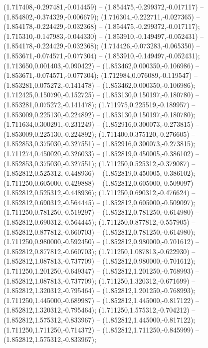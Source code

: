  (1.717408,-0.297481,-0.014459) -- (1.854475,-0.299372,-0.017117) -- (1.854802,-0.374329,-0.006679);
 (1.716304,-0.222711,-0.027365) -- (1.854178,-0.224429,-0.032368) -- (1.854475,-0.299372,-0.017117);
 (1.715310,-0.147983,-0.044330) -- (1.853910,-0.149497,-0.052431) -- (1.854178,-0.224429,-0.032368);
 (1.714426,-0.073283,-0.065350) -- (1.853671,-0.074571,-0.077304) -- (1.853910,-0.149497,-0.052431);
 (1.713650,0.001403,-0.090422) -- (1.853462,0.000350,-0.106986) -- (1.853671,-0.074571,-0.077304);
 (1.712984,0.076089,-0.119547) -- (1.853281,0.075272,-0.141478) -- (1.853462,0.000350,-0.106986);
 (1.712425,0.150790,-0.152725) -- (1.853130,0.150197,-0.180780) -- (1.853281,0.075272,-0.141478);
 (1.711975,0.225519,-0.189957) -- (1.853009,0.225130,-0.224892) -- (1.853130,0.150197,-0.180780);
 (1.711634,0.300291,-0.231249) -- (1.852916,0.300073,-0.273815) -- (1.853009,0.225130,-0.224892);
 (1.711400,0.375120,-0.276605) -- (1.852853,0.375030,-0.327551) -- (1.852916,0.300073,-0.273815);
 (1.711274,0.450020,-0.326033) -- (1.852819,0.450005,-0.386102) -- (1.852853,0.375030,-0.327551);
 (1.711250,0.525312,-0.379087) -- (1.852812,0.525312,-0.448936) -- (1.852819,0.450005,-0.386102);
 (1.711250,0.605000,-0.429888) -- (1.852812,0.605000,-0.509097) -- (1.852812,0.525312,-0.448936);
 (1.711250,0.690312,-0.476624) -- (1.852812,0.690312,-0.564445) -- (1.852812,0.605000,-0.509097);
 (1.711250,0.781250,-0.519297) -- (1.852812,0.781250,-0.614980) -- (1.852812,0.690312,-0.564445);
 (1.711250,0.877812,-0.557905) -- (1.852812,0.877812,-0.660703) -- (1.852812,0.781250,-0.614980);
 (1.711250,0.980000,-0.592450) -- (1.852812,0.980000,-0.701612) -- (1.852812,0.877812,-0.660703);
 (1.711250,1.087813,-0.622930) -- (1.852812,1.087813,-0.737709) -- (1.852812,0.980000,-0.701612);
 (1.711250,1.201250,-0.649347) -- (1.852812,1.201250,-0.768993) -- (1.852812,1.087813,-0.737709);
 (1.711250,1.320312,-0.671699) -- (1.852812,1.320312,-0.795464) -- (1.852812,1.201250,-0.768993);
 (1.711250,1.445000,-0.689987) -- (1.852812,1.445000,-0.817122) -- (1.852812,1.320312,-0.795464);
 (1.711250,1.575312,-0.704212) -- (1.852812,1.575312,-0.833967) -- (1.852812,1.445000,-0.817122);
 (1.711250,1.711250,-0.714372) -- (1.852812,1.711250,-0.845999) -- (1.852812,1.575312,-0.833967);
